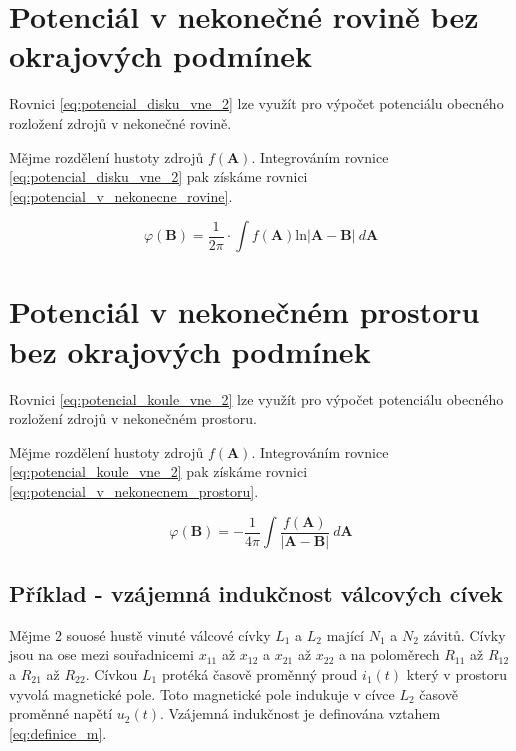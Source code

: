 \documentclass{book}
\newcommand{\vect}[1]{\boldsymbol{#1}}
\begin{document}
\section{Potenciál v nekonečné rovině bez okrajových podmínek}

Rovnici \eqref{eq:potencial_disku_vne_2} lze využít pro výpočet potenciálu obecného rozložení zdrojů v nekonečné rovině.

Mějme rozdělení hustoty zdrojů \(f(\vect{A})\). Integrováním rovnice \eqref{eq:potencial_disku_vne_2} pak získáme rovnici \eqref{eq:potencial_v_nekonecne_rovine}.

\begin{equation}
\label{eq:potencial_v_nekonecne_rovine}
\varphi(\vect{B}) = \frac{1}{2 \pi} \cdot \int f(\vect{A}) \mathrm{ln} |\vect{A} - \vect{B}| \ d\vect{A}
\end{equation}

\section{Potenciál v nekonečném prostoru bez okrajových podmínek}

Rovnici \eqref{eq:potencial_koule_vne_2} lze využít pro výpočet potenciálu obecného rozložení zdrojů v nekonečném prostoru.

Mějme rozdělení hustoty zdrojů \(f(\vect{A})\). Integrováním rovnice \eqref{eq:potencial_koule_vne_2} pak získáme rovnici \eqref{eq:potencial_v_nekonecnem_prostoru}.

\begin{equation}
\label{eq:potencial_v_nekonecnem_prostoru}
\varphi(\vect{B}) = -\frac{1}{4 \pi} \int \frac{f(\vect{A})}{|\vect{A} - \vect{B}|} \ d\vect{A}
\end{equation}

\subsection{Příklad - vzájemná indukčnost válcových cívek}

Mějme 2 souosé hustě vinuté válcové cívky \(L_1\) a \(L_2\) mající \(N_1\) a \(N_2\) závitů. Cívky jsou na ose mezi souřadnicemi \(x_{11}\) až \(x_{12}\) a \(x_{21}\) až \(x_{22}\) a na poloměrech \(R_{11}\) až \(R_{12}\) a \(R_{21}\) až \(R_{22}\). Cívkou \(L_1\) protéká časově proměnný proud \(i_1(t)\) který v prostoru vyvolá magnetické pole. Toto magnetické pole indukuje v cívce \(L_2\) časově proměnné napětí \(u_2(t)\). Vzájemná indukčnost je definována vztahem \eqref{eq:definice_m}.
\end{document}

